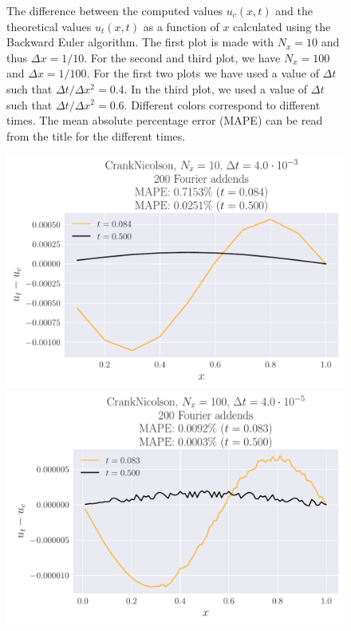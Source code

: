 \documentclass[reprint, english,notitlepage,nofootinbib]{revtex4-1}  %
\begin{document}
\begin{figure}
  \caption{The difference between the computed values \(u_c(x, t)\) and the theoretical values \(u_t(x, t)\) as a function of \(x\) calculated using the Backward Euler algorithm. The first plot is made with \(N_x = 10\) and thus \(\Delta x = 1/10\). For the second and third plot, we have \(N_x = 100\) and \(\Delta x = 1/100\). For the first two plots we have used a value of \(\Delta t\) such that \(\Delta t / \Delta x^2 = 0.4\). In the third plot, we used a value of \(\Delta t\) such that \(\Delta t / \Delta x^2 = 0.6\). Different colors correspond to different times. The mean absolute percentage error (MAPE) can be read from the title for the different times.}
  \label{fig:BackwardEuler_error}
\end{figure}
\begin{figure}
  \includegraphics[width=\linewidth]{CrankNicolson-Nt125-dt4_0e-03-Nx10-Error.pdf}
  \includegraphics[width=\linewidth]{CrankNicolson-Nt12499-dt4_0e-05-Nx100-Error.pdf}

\end{figure}
\end{document}
